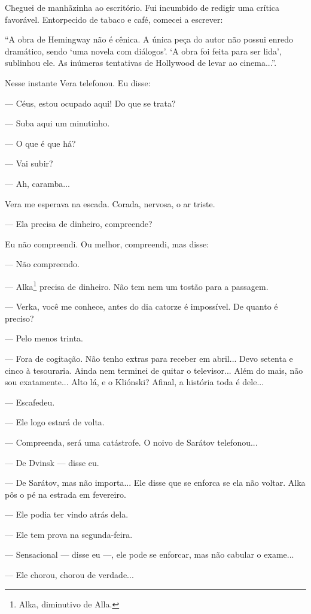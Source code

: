 Cheguei de manhãzinha ao escritório. Fui incumbido de redigir uma
crítica favorável. Entorpecido de tabaco e café, comecei a escrever:

``A obra de Hemingway não é cênica. A única peça do autor não possui
enredo dramático, sendo `uma novela com diálogos'. `A obra foi feita
para ser lida', sublinhou ele. As inúmeras tentativas de Hollywood de
levar ao cinema...''.

Nesse instante Vera telefonou. Eu disse:

--- Céus, estou ocupado aqui! Do que se trata?

--- Suba aqui um minutinho.

--- O que é que há?

--- Vai subir?

--- Ah, caramba...

Vera me esperava na escada. Corada, nervosa, o ar triste.

--- Ela precisa de dinheiro, compreende?

Eu não compreendi. Ou melhor, compreendi, mas disse:

--- Não compreendo.

--- Alka\footnote{Alka, diminutivo de Alla.} precisa de dinheiro. Não
tem nem um tostão para a passagem.

--- Verka, você me conhece, antes do dia catorze é impossível. De quanto
é preciso?

--- Pelo menos trinta.

--- Fora de cogitação. Não tenho extras para receber em abril... Devo
setenta e cinco à tesouraria. Ainda nem terminei de quitar o
televisor... Além do mais, não sou exatamente... Alto lá, e o Kliónski?
Afinal, a história toda é dele...

--- Escafedeu.

--- Ele logo estará de volta.

--- Compreenda, será uma catástrofe. O noivo de Sarátov telefonou...

--- De Dvinsk --- disse eu.

--- De Sarátov, mas não importa... Ele disse que se enforca se ela não
voltar. Alka pôs o pé na estrada em fevereiro.

--- Ele podia ter vindo atrás dela.

--- Ele tem prova na segunda-feira.

--- Sensacional --- disse eu ---, ele pode se enforcar, mas não cabular
o exame...

--- Ele chorou, chorou de verdade...

